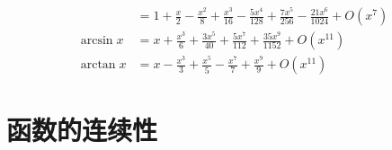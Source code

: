 \[\begin{aligned}
		              & = 1 + \frac{x}{2}-\frac{x^2}{8} +\frac{x^3}{16}-\frac{5 x^4}{128} +\frac{7 x^5}{256}   - \frac{21x^6}{1024}   +  O(x^{7})                       \\
		\arcsin x     & = x + \frac{x^3}{6} + \frac{3x^5}{40} + \frac{5 x^7}{112} + \frac{35x^9}{1152}                                                + O(x^{11})       \\
		\arctan x     & = x - \frac{x^3}{3} + \frac{x^5}{5} - \frac{x^7}{7}                                                     + \frac{x^9}{9}          + O(x^{11})
	\end{aligned}
\]


\section{函数的连续性}

